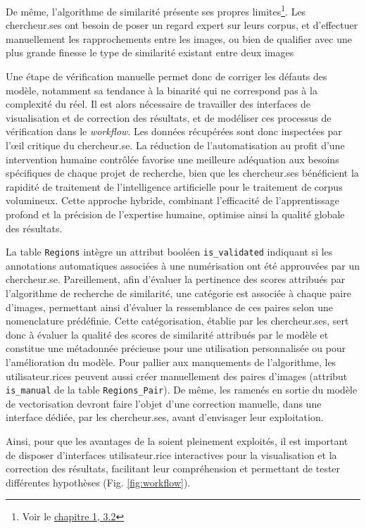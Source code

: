 De même, l'algorithme de similarité présente ses propres limites\footnote{Voir le \hyperlink{developpement-dune-interface-commune}{chapitre 1, 3.2}}. Les chercheur.ses ont besoin de poser un regard expert sur leurs corpus, et d'effectuer manuellement les rapprochements entre les images, ou bien de qualifier avec une plus grande finesse le type de similarité existant
entre deux images

Une étape de vérification manuelle permet donc de corriger les défauts
des modèle, notamment sa tendance à la binarité qui ne correspond pas à
la complexité du réel. Il est alors nécessaire de travailler des
interfaces de visualisation et de correction des résultats, et de
modéliser ces processus de vérification dans le \textit{workflow}. Les données
récupérées sont donc inspectées par l'œil critique du chercheur.se. La
réduction de l'automatisation au profit d'une intervention humaine
contrôlée favorise une meilleure adéquation aux besoins spécifiques de
chaque projet de recherche, bien que les chercheur.ses bénéficient la
rapidité de traitement de l'intelligence artificielle pour le traitement
de corpus volumineux. Cette approche hybride, combinant l'efficacité de
l'apprentissage profond et la précision de l'expertise humaine, optimise
ainsi la qualité globale des résultats.

La table \texttt{Regions} intègre un attribut booléen \texttt{is\_validated} indiquant si
les annotations automatiques associées à une numérisation ont été
approuvées par un chercheur.se. Pareillement, afin d'évaluer la pertinence
des scores attribués par l'algorithme de recherche de similarité, une
catégorie est associée à chaque paire d'images, permettant ainsi d'évaluer la ressemblance de ces paires selon une nomenclature
prédéfinie. Cette catégorisation, établie par les chercheur.ses, sert donc
à évaluer la qualité des scores de similarité attribués par le modèle et
constitue une métadonnée précieuse pour une utilisation personnalisée ou
pour l'amélioration du modèle. Pour pallier aux manquements de
l'algorithme, les utilisateur.rices peuvent aussi créer
manuellement des paires d'images (attribut \texttt{is\_manual} de la table
\texttt{Regions\_Pair}). De même, les \svgs ramenés en sortie du modèle de
vectorisation devront faire l'objet d'une correction manuelle, dans une
interface dédiée, par les chercheur.ses, avant d'envisager leur
exploitation.

Ainsi, pour que les avantages de la \cv soient
pleinement exploités, il est important de disposer d'interfaces
utilisateur.rice interactives pour la visualisation et la correction des
résultats, facilitant leur compréhension et permettant de tester
différentes hypothèses (Fig. \ref{fig:workflow}).

